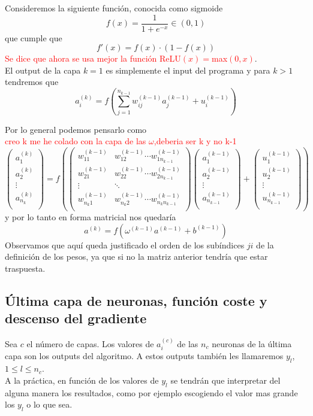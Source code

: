 \documentclass{article}
\begin{document}
Consideremos la siguiente función, conocida como sigmoide
$$f(x)=\frac1{1+e^{-x}}\in (0,1) $$
que cumple que 
$$f'(x)=f(x)\cdot (1-f(x)) $$
\textcolor{red}{Se dice que ahora se usa mejor la función ReLU$(x)=$max$(0,x) $}.\\
El output de la capa $k=1$ es simplemente el input del programa y para $k>1$ tendremos que
$$a^{(k)}_i=f(\sum_{j=1}^{n_{k-1}} w^{(k-1)}_{ij}a^{(k-1)}_j+u^{(k-1)}_i) $$

Por lo general podemos pensarlo como \\
\textcolor{red}{creo k me he colado con la capa de las $\omega$,deberia ser k y no k-1}
$$
\begin{pmatrix}
a^{(k)}_1 \\
a^{(k)}_2 \\
\vdots \\
a^{(k)}_{n_k} \\
\end{pmatrix}
=f\left(
\begin{pmatrix}
w^{(k-1)}_{11} & w^{(k-1)}_{12} \cdots w^{(k-1)}_{1n_{k-1}}\\
w^{(k-1)}_{21} & w^{(k-1)}_{22} \cdots w^{(k-1)}_{2n_{k-1}}\\
\vdots   & \ddots  \\
w^{(k-1)}_{{n_k}1} & w^{(k-1)}_{{n_k}2} \cdots w^{(k-1)}_{{n_k}n_{k-1}}\\
\end{pmatrix} 
\begin{pmatrix}
a^{(k-1)}_1 \\
a^{(k-1)}_2 \\
\vdots \\
a^{(k-1)}_{n_{k-1}} \\
\end{pmatrix}
+
\begin{pmatrix}
u^{(k-1)}_1 \\
u^{(k-1)}_2 \\
\vdots \\
u^{(k-1)}_{n_{k-1}} \\
\end{pmatrix}\right)$$
y por lo tanto en forma matricial nos quedaría
$$a^{(k)}=f(\omega^{(k-1)}a^{(k-1)}+b^{(k-1)}) $$
Observamos que aquí queda justificado el orden de los subíndices $ji$ de la definición de los pesos, ya que si no la matriz anterior tendría que estar traspuesta.
\subsection{Última capa de neuronas, función coste y descenso del gradiente}
Sea $c$ el número de capas. Los valores de $a^{(c)}_i$ de las $n_c$ neuronas de la última capa son los outputs del algoritmo. A estos outputs también les llamaremos $y_l$, $1\leq l\leq n_c $.\\
A la práctica, en función de los valores de $y_l$ se tendrán que interpretar del alguna manera los resultados, como por ejemplo escogiendo el valor mas grande los $y_l$ o lo que sea.\\
\end{document}
